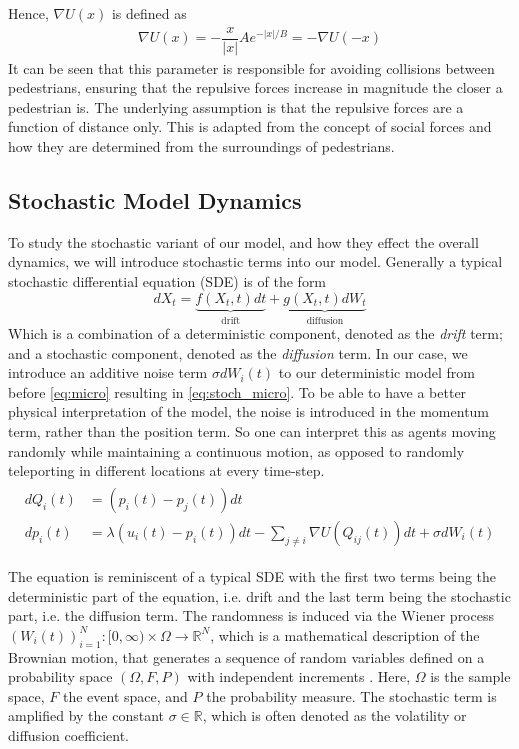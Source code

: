 Hence, $\nabla U(x)$ is defined as
\begin{align} 
    \nabla U(x) = -\dfrac{x}{|x|}Ae^{-|x|/B} = -\nabla U(-x)
    \label{eq:def_U}
\end{align}
It can be seen that this parameter is responsible for avoiding collisions between pedestrians, ensuring that the repulsive forces increase in magnitude the closer a pedestrian is. The underlying assumption is that the repulsive forces are a function of distance only. This is adapted from the concept of social forces and how they are determined from the surroundings of pedestrians.

\subsection{Stochastic Model Dynamics}

To study the stochastic variant of our model, and how they effect the overall dynamics, we will introduce stochastic terms into our model. Generally a typical stochastic differential equation (SDE) is of the form
\begin{equation*}
    dX_t = \underbrace{f(X_t, t)dt}_{\text{drift}} + \underbrace{g(X_t, t)dW_t}_{\text{diffusion}}
\end{equation*}
Which is a combination of a deterministic component, denoted as the \textit{drift} term; and a stochastic component, denoted as the \textit{diffusion} term. In our case, we introduce an additive noise term $\sigma dW_i(t)$ to our deterministic model from before \autoref{eq:micro} resulting in \autoref{eq:stoch_micro}. To be able to have a better physical interpretation of the model, the noise is introduced in the momentum term, rather than the position term. So one can interpret this as agents moving randomly while maintaining a continuous motion, as opposed to randomly teleporting in different locations at every time-step.
\begin{gather}
\begin{aligned}
    dQ_{i}(t) &= (p_i(t) - p_j(t))dt \\
    dp_i(t) &= \lambda(u_i(t) - p_i(t))dt - \sum_{j \neq i} \nabla U (Q_{ij}(t))dt + \sigma dW_i(t)
    \label{eq:stoch_micro}
\end{aligned}
\end{gather}

The equation is reminiscent of a typical SDE with the first two terms being the deterministic part of the equation, i.e. drift and the last term being the stochastic part, i.e. the diffusion term. The randomness is induced via the Wiener process $(W_i(t))^N_{i=1}: [0,\infty) \times \Omega \rightarrow \mathbb{R}^N$, which is a mathematical description of the Brownian motion, that generates a sequence of random variables defined on a probability space $(\Omega, F, P)$ with independent increments \cite{oksendal2003stochastic}. Here, $\Omega$ is the sample space, $F$ the event space, and $P$ the probability measure. The stochastic term is amplified by the constant $\sigma \in \mathbb{R}$, which is often denoted as the volatility or diffusion coefficient.


